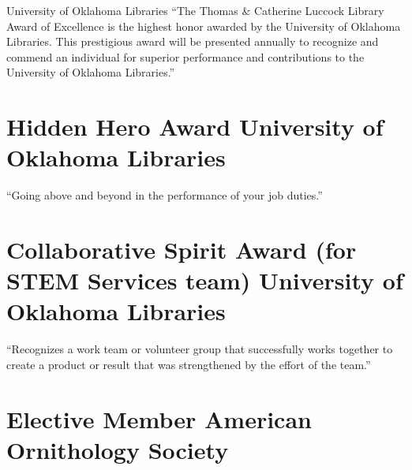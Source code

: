 \documentclass[
  letterpaper,
  DIV=11,
  numbers=noendperiod,
  oneside]{scrreprt}
\begin{document}
University of Oklahoma Libraries ``The Thomas \& Catherine Luccock
Library Award of Excellence is the highest honor awarded by the
University of Oklahoma Libraries. This prestigious award will be
presented annually to recognize and commend an individual for superior
performance and contributions to the University of Oklahoma Libraries.''

\section{Hidden Hero Award University of Oklahoma
Libraries}\label{hidden-hero-award-university-of-oklahoma-libraries}


``Going above and beyond in the performance of your job duties.''

\section{Collaborative Spirit Award (for STEM Services team) University
of Oklahoma
Libraries}\label{collaborative-spirit-award-for-stem-services-team-university-of-oklahoma-libraries}


``Recognizes a work team or volunteer group that successfully works
together to create a product or result that was strengthened by the
effort of the team.''

\section{Elective Member American Ornithology
Society}\label{sec-aos-elective}

\end{document}
